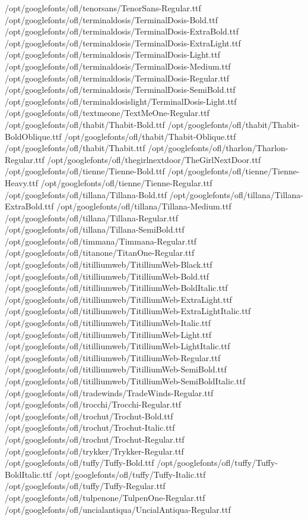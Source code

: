 /opt/googlefonts/ofl/tenorsans/TenorSans-Regular.ttf
/opt/googlefonts/ofl/terminaldosis/TerminalDosis-Bold.ttf
/opt/googlefonts/ofl/terminaldosis/TerminalDosis-ExtraBold.ttf
/opt/googlefonts/ofl/terminaldosis/TerminalDosis-ExtraLight.ttf
/opt/googlefonts/ofl/terminaldosis/TerminalDosis-Light.ttf
/opt/googlefonts/ofl/terminaldosis/TerminalDosis-Medium.ttf
/opt/googlefonts/ofl/terminaldosis/TerminalDosis-Regular.ttf
/opt/googlefonts/ofl/terminaldosis/TerminalDosis-SemiBold.ttf
/opt/googlefonts/ofl/terminaldosislight/TerminalDosis-Light.ttf
/opt/googlefonts/ofl/textmeone/TextMeOne-Regular.ttf
/opt/googlefonts/ofl/thabit/Thabit-Bold.ttf
/opt/googlefonts/ofl/thabit/Thabit-BoldOblique.ttf
/opt/googlefonts/ofl/thabit/Thabit-Oblique.ttf
/opt/googlefonts/ofl/thabit/Thabit.ttf
/opt/googlefonts/ofl/tharlon/Tharlon-Regular.ttf
/opt/googlefonts/ofl/thegirlnextdoor/TheGirlNextDoor.ttf
/opt/googlefonts/ofl/tienne/Tienne-Bold.ttf
/opt/googlefonts/ofl/tienne/Tienne-Heavy.ttf
/opt/googlefonts/ofl/tienne/Tienne-Regular.ttf
/opt/googlefonts/ofl/tillana/Tillana-Bold.ttf
/opt/googlefonts/ofl/tillana/Tillana-ExtraBold.ttf
/opt/googlefonts/ofl/tillana/Tillana-Medium.ttf
/opt/googlefonts/ofl/tillana/Tillana-Regular.ttf
/opt/googlefonts/ofl/tillana/Tillana-SemiBold.ttf
/opt/googlefonts/ofl/timmana/Timmana-Regular.ttf
/opt/googlefonts/ofl/titanone/TitanOne-Regular.ttf
/opt/googlefonts/ofl/titilliumweb/TitilliumWeb-Black.ttf
/opt/googlefonts/ofl/titilliumweb/TitilliumWeb-Bold.ttf
/opt/googlefonts/ofl/titilliumweb/TitilliumWeb-BoldItalic.ttf
/opt/googlefonts/ofl/titilliumweb/TitilliumWeb-ExtraLight.ttf
/opt/googlefonts/ofl/titilliumweb/TitilliumWeb-ExtraLightItalic.ttf
/opt/googlefonts/ofl/titilliumweb/TitilliumWeb-Italic.ttf
/opt/googlefonts/ofl/titilliumweb/TitilliumWeb-Light.ttf
/opt/googlefonts/ofl/titilliumweb/TitilliumWeb-LightItalic.ttf
/opt/googlefonts/ofl/titilliumweb/TitilliumWeb-Regular.ttf
/opt/googlefonts/ofl/titilliumweb/TitilliumWeb-SemiBold.ttf
/opt/googlefonts/ofl/titilliumweb/TitilliumWeb-SemiBoldItalic.ttf
/opt/googlefonts/ofl/tradewinds/TradeWinds-Regular.ttf
/opt/googlefonts/ofl/trocchi/Trocchi-Regular.ttf
/opt/googlefonts/ofl/trochut/Trochut-Bold.ttf
/opt/googlefonts/ofl/trochut/Trochut-Italic.ttf
/opt/googlefonts/ofl/trochut/Trochut-Regular.ttf
/opt/googlefonts/ofl/trykker/Trykker-Regular.ttf
/opt/googlefonts/ofl/tuffy/Tuffy-Bold.ttf
/opt/googlefonts/ofl/tuffy/Tuffy-BoldItalic.ttf
/opt/googlefonts/ofl/tuffy/Tuffy-Italic.ttf
/opt/googlefonts/ofl/tuffy/Tuffy-Regular.ttf
/opt/googlefonts/ofl/tulpenone/TulpenOne-Regular.ttf
/opt/googlefonts/ofl/uncialantiqua/UncialAntiqua-Regular.ttf
